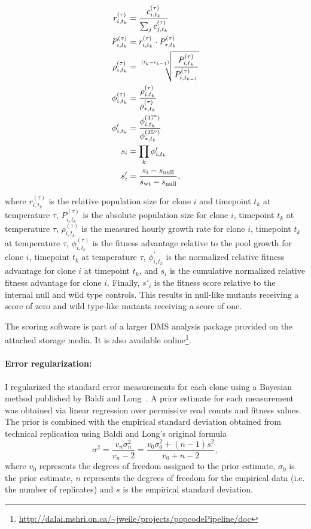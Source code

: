 \begin{align*}
r_{i,t_k}^{(\tau)} &= \frac{ c_{i,t_k}^{(\tau)} }{ \sum_j c_{j,t_k}^{(\tau)} }\\
P_{i,t_k}^{(\tau)} &= r_{i,t_k}^{(\tau)} \cdot P_{*,t_k}^{(\tau)} \\
\rho_{i,t_k}^{(\tau)} &= \sqrt[\uproot{5}(t_k - t_{k-1})]{\frac{P_{i,t_k}^{(\tau)}}{P_{i,t_{k-1}}^{(\tau)}}} \\
\phi_{i,t_k}^{(\tau)} &= \frac{\rho_{i,t_k}^{(\tau)}}{\rho_{*,t_k}^{(\tau)}}\\
\phi_{i,t_k}^\prime &= \frac{\phi_{i,t_k}^{(37^{\circ})}}{\phi_{*,t_k}^{(25^{\circ})}}\\
s_i &= \prod_k \phi_{i,t_k}^\prime \\
s'_i &= \frac{s_i - s_\text{null}}{s_\text{wt} - s_\text{null}},
\end{align*}

where $r_{i,t_k}^{(\tau)}$ is the relative population size for clone $i$ and timepoint $t_k$ at temperature $\tau$, $P_{i,t_k}^{(\tau)}$ is the absolute population size for clone $i$, timepoint $t_k$ at temperature $\tau$, $\rho_{i,t_k}^{(\tau)}$ is the measured hourly growth rate for clone $i$, timepoint $t_k$ at temperature $\tau$, $\phi_{i,t_k}^{(\tau)}$ is the fitness advantage relative to the pool growth for clone $i$, timepoint $t_k$ at temperature $\tau$, $\phi_{i,t_k}^\prime$ is the normalized relative fitness advantage for clone $i$ at timepoint $t_k$, and $s_i$ is the cumulative normalized relative fitness advantage for clone $i$. Finally, $s'_i$ is the fitness score relative to the internal null and wild type controls. This results in null-like mutants receiving a score of zero and wild type-like mutants receiving a score of one.

The scoring software is part of a larger DMS analysis package provided on the attached storage media. It is also available online\footnote{\url{http://dalai.mshri.on.ca/~jweile/projects/popcodePipeline/doc}}.

\paragraph{Error regularization: } I regularized the standard error measurements for each clone using a Bayesian method published by Baldi and Long~\cite{baldi_bayesian_2001}. A prior estimate for each measurement was obtained via linear regression over permissive read counts and fitness values. The prior is combined with the empirical standard deviation obtained from technical replication using Baldi and Long's original formula $$\sigma^2 = \frac{v_n \sigma_n^2}{v_n - 2} = \frac{v_0 \sigma_0^2 + (n-1)s^2}{v_0 + n - 2},$$ where $v_0$ represents the degrees of freedom assigned to the prior estimate, $\sigma_0$ is the prior estimate, $n$ represents the degrees of freedom for the empirical data (i.e. the number of replicates) and $s$ is the empirical standard deviation.

